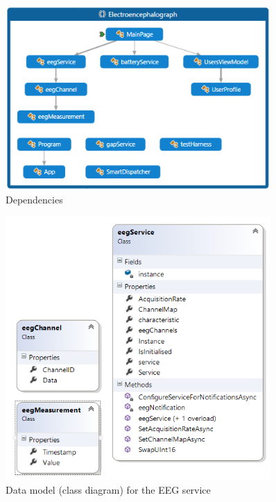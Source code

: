 \documentclass[]{article}
\begin{document}
\begin{figure}[htb]
	\begin{center}
		\includegraphics[width = 0.9\textwidth]{dep}
	\end{center}
	\caption{Dependencies}
	\label{fig:dep}
\end{figure}

\begin{figure}[htb]
	\begin{center}
		\includegraphics[width = 0.9\textwidth]{classdiagram}
	\end{center}
	\caption{Data model (class diagram) for the \ac{EEG} service}
	\label{fig:classdiagram}
\end{figure}
\end{document}
